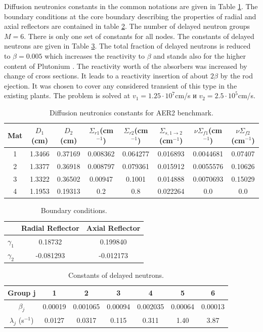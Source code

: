 \documentclass{aip-cp}
\begin{document}
Diffusion neutronics constants in the common notations are given in Table \ref{t-1}. The boundary
conditions at the core boundary describing the properties of radial and axial reflectors are contained in table \ref{t-2}. The number of delayed neutron groups $M = 6$. There is only one set of constants for all nodes. The constants of delayed neutrons are given in Table \ref{t-3}. The total fraction of delayed neutrons is reduced to $\beta = 0.005$ which increases the reactivity to $\beta$ and stands also for the higher content of Plutonium . The reactivity worth of the absorbers was increased by change of cross sections. It leads to a reactivity insertion of about $2\beta$ by the rod ejection. It was chosen to cover any considered transient of this type in the existing plants. The problem is solved at $v_1 = 1.25 \cdot 10^7 $cm/s и  $v_2 = 2.5 \cdot 10^5$cm/s.
\begin{table}[!h]
\caption{Diffusion neutronics constants for AER2 benchmark.}
\label{t-1}
\begin{tabular}{cccccccc}
\hline
Mat & $D_1$(cm)  & $D_2$(cm)  & $\Sigma_{r1}$(cm$^{-1}$) & $\Sigma_{r2}$(cm$^{-1}$) & $\Sigma_{s,1\to 2}$(cm$^{-1}$) &  $\nu\Sigma_{f1}$(cm$^{-1}$) & $\nu\Sigma_{f2}$(cm$^{-1}$) \\
\hline
1&1.3466 & 0.37169 & 0.008362 & 0.064277 & 0.016893 & 0.0044681 & 0.07407 \\
2&1.3377&0.36918&0.008797&0.079361&0.015912&0.0055576&0.10626 \\
3&1.3322&0.36502&0.00947&0.1001&0.014888&0.0070693&0.15029\\
4&1.1953&0.19313&0.2&0.8&0.022264&0.0&0.0\\
\hline
\end{tabular}
\end{table}

\begin{table}[!h]
\caption{Boundary conditions.}
\label{t-2}
\begin{tabular}{ccc}
\hline
&Radial Reflector&Axial Reflector\\
\hline
$\gamma_1$& 0.18732 & 0.199840\\
$\gamma_2$& -0.081293 & -0.012173\\
\hline
\end{tabular}
\end{table}

\begin{table}[!h]
\caption{Constants of delayed neutrons.}
\label{t-3}
\begin{tabular}{ccccccc}
\hline
Group j &1&2&3&4&5&6\\
\hline
$\beta_j$ &0.00019&0.001065&0.00094&0.002035&0.00064&0.00013\\
$\lambda_j$ (s$^{-1}$)&0.0127&0.0317&0.115&0.311&1.40&3.87\\
\hline
\end{tabular}
\end{table}
\end{document}
